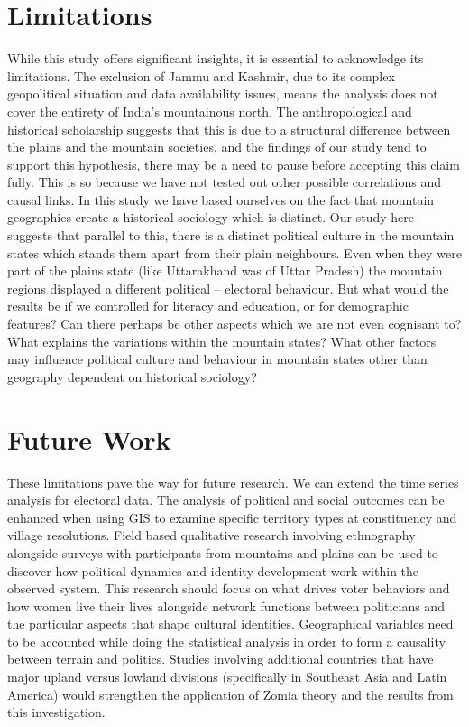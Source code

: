 \section{Limitations}
While this study offers significant insights, it is essential to acknowledge its limitations. The exclusion of Jammu and Kashmir, due to its complex geopolitical situation and data availability issues, means the analysis does not cover the entirety of India's mountainous north. The anthropological and historical scholarship suggests that this is due to a structural difference between the plains and the mountain societies, and the findings of our study tend to support this hypothesis, there may be a need to pause before accepting this claim fully. This is so because we have not tested out other possible correlations and causal links. In this study we have based ourselves on the fact that mountain geographies create a historical sociology which is distinct. Our study here suggests that parallel to this, there is a distinct political culture in the mountain states which stands them apart from their plain neighbours. Even when they were part of the plains state (like Uttarakhand was of Uttar Pradesh) the mountain regions displayed a different political – electoral behaviour. But what would the results be if we controlled for literacy and education, or for demographic features? Can there perhaps be other aspects which we are not even cognisant to?  What explains the variations within the mountain states? What other factors may influence political culture and behaviour in mountain states other than geography dependent on historical sociology?  

\section{Future Work}

These limitations pave the way for future research. We can extend the time series analysis for electoral data. The analysis of political and social outcomes can be enhanced when using GIS to examine specific territory types at constituency and village resolutions. Field based qualitative research involving ethnography alongside surveys with participants from mountains and plains can be used to discover how political dynamics and identity development work within the observed system. This research should focus on what drives voter behaviors and how women live their lives alongside network functions between politicians and the particular aspects that shape cultural identities. Geographical variables need to be accounted while doing the statistical analysis in order to form a causality between terrain and politics. Studies involving additional countries that have major upland versus lowland divisions (specifically in Southeast Asia and Latin America) would strengthen the application of Zomia theory and the results from this investigation. 

